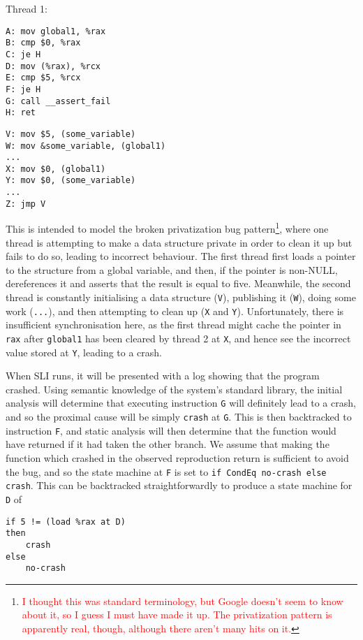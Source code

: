 \documentclass[10pt,twocolumn,preprint,natbib,authoryear]{sigplanconf}
\newcommand{\editorial}[1]{\textcolor{red}{\footnote{\textcolor{red}{#1}}}}
\begin{document}
Thread 1:

\begin{verbatim}
A: mov global1, %rax
B: cmp $0, %rax
C: je H
D: mov (%rax), %rcx
E: cmp $5, %rcx
F: je H
G: call __assert_fail
H: ret
\end{verbatim}

\begin{verbatim}
V: mov $5, (some_variable)
W: mov &some_variable, (global1)
...
X: mov $0, (global1)
Y: mov $0, (some_variable)
...
Z: jmp V
\end{verbatim}

This is intended to model the broken privatization bug
pattern\editorial{I thought this was standard terminology, but Google
  doesn't seem to know about it, so I guess I must have made it
  up. The privatization pattern is apparently real, though, although
  there aren't many hits on it.}, where one thread is attempting to
make a data structure private in order to clean it up but fails to do
so, leading to incorrect behaviour.  The first thread first loads a
pointer to the structure from a global variable, and then, if the
pointer is non-NULL, dereferences it and asserts that the result is
equal to five.  Meanwhile, the second thread is constantly
initialising a data structure (\verb|V|), publishing it (\verb|W|),
doing some work (\verb|...|), and then attempting to clean up
(\verb|X| and \verb|Y|).  Unfortunately, there is insufficient
synchronisation here, as the first thread might cache the pointer in
\verb|rax| after \verb|global1| has been cleared by thread 2 at
\verb|X|, and hence see the incorrect value stored at \verb|Y|,
leading to a crash.

When SLI runs, it will be presented with a log showing that the
program crashed.  Using semantic knowledge of the system's standard
library, the initial analysis will determine that executing
instruction \verb|G| will definitely lead to a crash, and so the
proximal cause will be simply \verb|crash| at \verb|G|.  This is then
backtracked to instruction \verb|F|, and static analysis will then
determine that the function would have returned if it had taken the
other branch.  We assume that making the function which crashed in the
observed reproduction return is sufficient to avoid the bug, and so
the state machine at \verb|F| is set to
\verb|if CondEq no-crash else crash|.  This can be backtracked
straightforwardly to produce a state machine for \verb|D| of

\begin{verbatim}
if 5 != (load %rax at D)
then
    crash
else
    no-crash
\end{verbatim}
\end{document}
